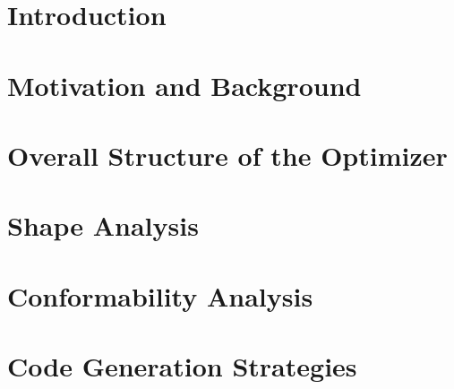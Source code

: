 \documentclass[sigplan,screen,10pt]{acmart}\settopmatter{}
\begin{document}
\maketitle

%

\section{Introduction} \label{Sec:introduction}


\section{Motivation and Background} \label{Sec:background}


\section{Overall Structure of the Optimizer} \label{Sec:overview}


\section{Shape Analysis} \label{Sec:shape}


\section{Conformability Analysis} \label{Sec:conformability}


\section{Code Generation Strategies} \label{Sec:codegen}

\end{document}
